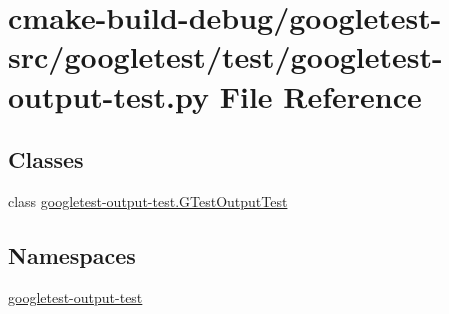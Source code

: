 \hypertarget{googletest-output-test_8py}{}\section{cmake-\/build-\/debug/googletest-\/src/googletest/test/googletest-\/output-\/test.py File Reference}
\label{googletest-output-test_8py}
\subsection*{Classes}
\begin{DoxyCompactItemize}
\item 
class \mbox{\hyperlink{classgoogletest-output-test_1_1GTestOutputTest}{googletest-\/output-\/test.\+G\+Test\+Output\+Test}}
\end{DoxyCompactItemize}
\subsection*{Namespaces}
\begin{DoxyCompactItemize}
\item 
 \mbox{\hyperlink{namespacegoogletest-output-test}{googletest-\/output-\/test}}
\end{DoxyCompactItemize}
